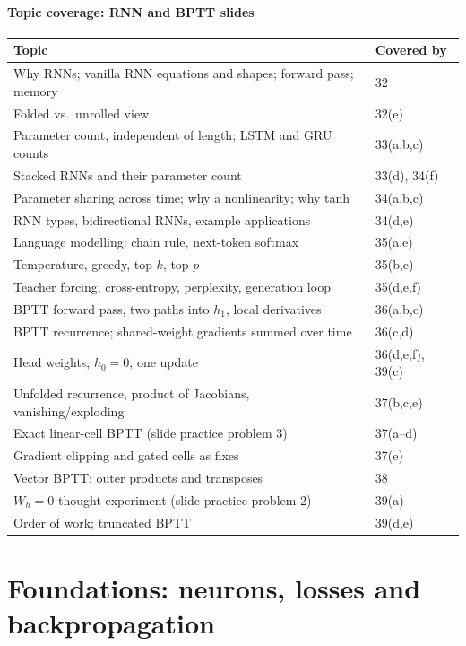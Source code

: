 \documentclass[12pt,a4paper]{article}
\begin{document}
\subsection*{Topic coverage: RNN and BPTT slides}
\begin{center}
\begin{tabular}{@{}>{\raggedright\arraybackslash}p{}l@{}}
\toprule
Topic & Covered by\\
\midrule
Why RNNs; vanilla RNN equations and shapes; forward pass; memory & 32\\
Folded vs.\ unrolled view & 32(e)\\
Parameter count, independent of length; LSTM and GRU counts & 33(a,b,c)\\
Stacked RNNs and their parameter count & 33(d), 34(f)\\
Parameter sharing across time; why a nonlinearity; why tanh & 34(a,b,c)\\
RNN types, bidirectional RNNs, example applications & 34(d,e)\\
Language modelling: chain rule, next-token softmax & 35(a,e)\\
Temperature, greedy, top-$k$, top-$p$ & 35(b,c)\\
Teacher forcing, cross-entropy, perplexity, generation loop & 35(d,e,f)\\
BPTT forward pass, two paths into $h_1$, local derivatives & 36(a,b,c)\\
BPTT recurrence; shared-weight gradients summed over time & 36(c,d)\\
Head weights, $h_0=0$, one update & 36(d,e,f), 39(c)\\
Unfolded recurrence, product of Jacobians, vanishing/exploding & 37(b,c,e)\\
Exact linear-cell BPTT (slide practice problem 3) & 37(a--d)\\
Gradient clipping and gated cells as fixes & 37(e)\\
Vector BPTT: outer products and transposes & 38\\
$W_h=0$ thought experiment (slide practice problem 2) & 39(a)\\
Order of work; truncated BPTT & 39(d,e)\\
\bottomrule
\end{tabular}
\end{center}

\newpage

\part{Foundations: neurons, losses and backpropagation}
\end{document}
